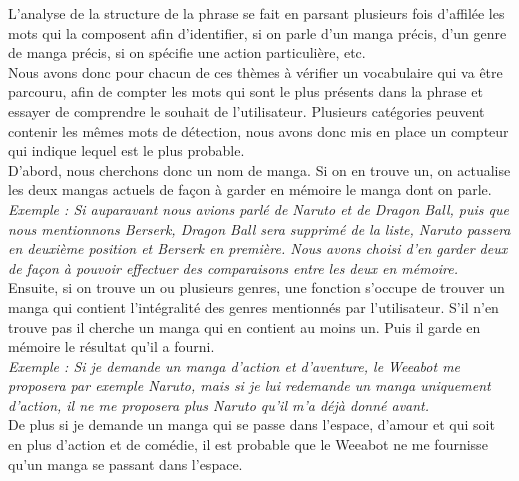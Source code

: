 \documentclass[paper=a4, fontsize=11pt]{article}
\begin{document}
L’analyse de la structure de la phrase se fait en parsant plusieurs fois d’affilée les mots qui la composent afin d’identifier, si on parle d’un manga précis, d’un genre de manga précis, si on spécifie une action particulière, etc.\\
Nous avons donc pour chacun de ces thèmes à vérifier un vocabulaire qui va être parcouru, afin de compter les mots qui sont le plus présents dans la phrase et essayer de comprendre le souhait de l’utilisateur. Plusieurs catégories peuvent contenir les mêmes mots de détection, nous avons donc mis en place un compteur qui indique lequel est le plus probable. \\
D’abord, nous cherchons donc un nom de manga. Si on en trouve un, on actualise les deux mangas actuels de façon à garder en mémoire le manga dont on parle.\\
\textit{Exemple : Si auparavant nous avions parlé de Naruto et de Dragon Ball, puis que nous mentionnons Berserk, Dragon Ball sera supprimé de la liste, Naruto passera en deuxième position et Berserk en première. Nous avons choisi d’en garder deux de façon à pouvoir effectuer des comparaisons entre les deux en mémoire.}\\

Ensuite, si on trouve un ou plusieurs genres, une fonction s’occupe de trouver un manga qui contient l’intégralité des genres mentionnés par l’utilisateur. S’il n’en trouve pas il cherche un manga qui en contient au moins un. Puis il garde en mémoire le résultat qu’il a fourni. \\
\textit{Exemple : Si je demande un manga d’action et d’aventure, le Weeabot me proposera par exemple Naruto, mais si je lui redemande un manga uniquement d’action, il ne me proposera plus Naruto qu’il m’a déjà donné avant.}\\ De plus si je demande un manga qui se passe dans l’espace, d’amour et qui soit en plus d’action et de comédie, il est probable que le Weeabot ne me fournisse qu’un manga se passant dans l’espace. \\
\end{document}
